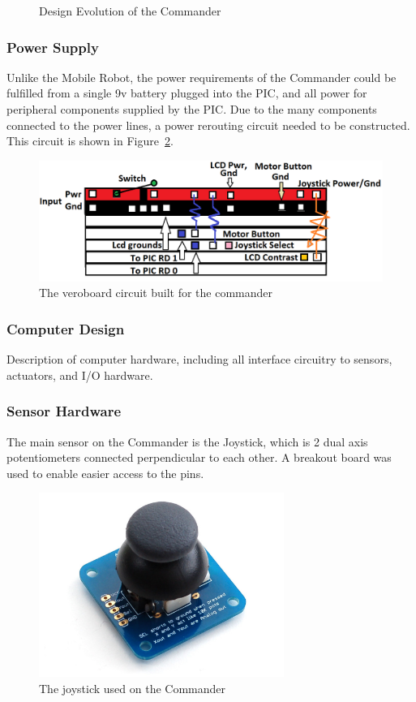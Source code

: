 \documentclass[11pt,a4paper]{article}
\begin{document}
\begin{figure}
\begin{subfigure}{\textbf{Final Commander Design}}
{        }
      \end{subfigure}
      \caption{Design Evolution of the Commander}
      \label{fig:commanderDesign}
    \end{figure}
    \subsubsection{Power Supply}
      Unlike the Mobile Robot, the power requirements of the Commander could be fulfilled from a single 9v battery plugged into the PIC, and all power for peripheral components supplied by the PIC. Due to the many components connected to the power lines, a power rerouting circuit needed to be constructed. This circuit is shown in Figure~\ref{fig:commanderVero}.
      \begin{figure}
        \includegraphics[width = 15cm]{commanderVero.png}
        \caption{The veroboard circuit built for the commander}
        \label{fig:commanderVero}
      \end{figure}
    \subsubsection{Computer Design}
      Description of computer hardware, including all interface circuitry to sensors, actuators, and I/O hardware.
    \subsubsection{Sensor Hardware}
    The main sensor on the Commander is the Joystick, which is 2 dual axis potentiometers connected perpendicular to each other. A breakout board was used to enable easier access to the pins.
    \begin{figure}[h]
      \includegraphics[width=8cm]{joystick.png}
      \caption{The joystick used on the Commander}
      \label{fig:joystick}
    \end{figure}
\end{document}
